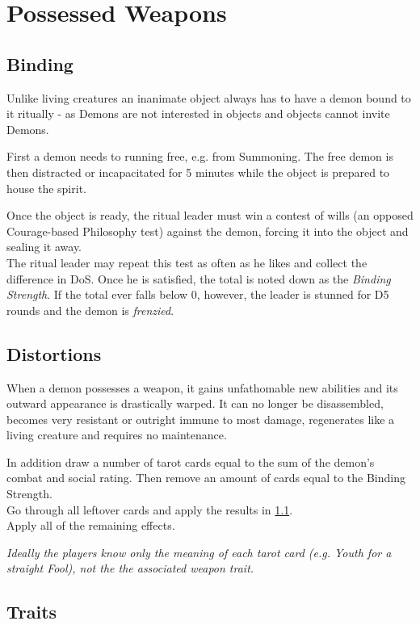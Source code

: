 \section{Possessed Weapons}
\label{sec:possessedweapon}
\subsection*{Binding}
Unlike living creatures an inanimate object always has to have a demon bound to it ritually
- as Demons are not interested in objects and objects cannot invite Demons.
\par
First a demon needs to running free, e.g. from Summoning.
The free demon is then distracted or incapacitated for 5 minutes while the object is prepared to house the spirit.
\par
Once the object is ready, the ritual leader must win a contest of wills
	(an opposed Courage-based Philosophy test)
	against the demon, forcing it into the object and sealing it away.
\\%
The ritual leader may repeat this test as often as he likes and collect the difference in DoS.
Once he is satisfied, the total is noted down as the \emph{Binding Strength}.
If the total ever falls below 0, however,
	the leader is stunned for D5 rounds
	and the demon is \emph{frenzied}.

\subsection*{Distortions}
When a demon possesses a weapon, it gains unfathomable new abilities and its outward appearance is drastically warped.
It can no longer be disassembled, becomes very resistant or outright immune to most damage, regenerates like a living creature and requires no maintenance.
\par
In addition draw a number of tarot cards equal to
	the sum of the demon's combat and social rating.
Then remove an amount of cards equal to the Binding Strength.\\
Go through all leftover cards and apply the results in \ref{sec:traits}.
\\%
Apply all of the remaining effects.
\begin{exampleblock}
	\itshape
	Ideally the players know only the meaning of each tarot card
	(e.g. \emph{Youth} for a straight Fool),
	not the the associated weapon trait.
\end{exampleblock}

\subsection{Traits}
\label{sec:traits}
